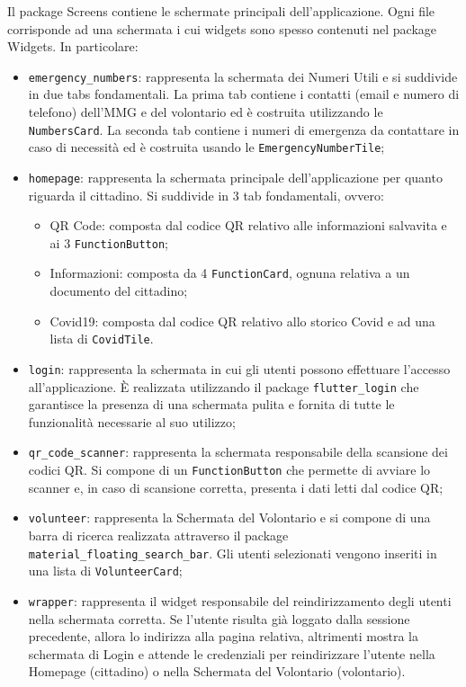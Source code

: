 \documentclass[12pt,a4paper,twoside,openright,titlepage]{book}
\begin{document}
Il package Screens contiene le schermate principali dell'applicazione. Ogni file corrisponde ad una schermata i cui widgets sono spesso contenuti nel package Widgets. In particolare:
\begin{itemize}
\item \texttt{emergency\_numbers}: rappresenta la schermata dei Numeri Utili e si suddivide in due tabs fondamentali. La prima tab contiene i contatti (email e numero di telefono) dell'MMG e del volontario ed è costruita utilizzando le \texttt{NumbersCard}. La seconda tab contiene i numeri di emergenza da contattare in caso di necessità ed è costruita usando le \texttt{EmergencyNumberTile};
\item \texttt{homepage}: rappresenta la schermata principale dell'applicazione per quanto riguarda il cittadino. Si suddivide in 3 tab fondamentali, ovvero:
\begin{itemize}
\item QR Code: composta dal codice QR relativo alle informazioni salvavita e ai 3 \texttt{FunctionButton};
\item Informazioni: composta da 4 \texttt{FunctionCard}, ognuna relativa a un documento del cittadino;
\item Covid19: composta dal codice QR relativo allo storico Covid e ad una lista di \texttt{CovidTile}.
\end{itemize}
\item \texttt{login}: rappresenta la schermata in cui gli utenti possono effettuare l'accesso all'applicazione. È realizzata utilizzando il package \texttt{flutter\_login} che garantisce la presenza di una schermata pulita e fornita di tutte le funzionalità necessarie al suo utilizzo;
\item \texttt{qr\_code\_scanner}: rappresenta la schermata responsabile della scansione dei codici QR. Si compone di un \texttt{FunctionButton} che permette di avviare lo scanner e, in caso di scansione corretta, presenta i dati letti dal codice QR;
\item \texttt{volunteer}: rappresenta la Schermata del Volontario e si compone di una barra di ricerca realizzata attraverso il package \texttt{material\_floating\_search\_bar}. Gli utenti selezionati vengono inseriti in una lista di \texttt{VolunteerCard};
\item \texttt{wrapper}: rappresenta il widget responsabile del reindirizzamento degli utenti nella schermata corretta. Se l'utente risulta già loggato dalla sessione precedente, allora lo indirizza alla pagina relativa, altrimenti mostra la schermata di Login e attende le credenziali per reindirizzare l'utente nella Homepage (cittadino) o nella Schermata del Volontario (volontario).
\end{itemize}
\end{document}
